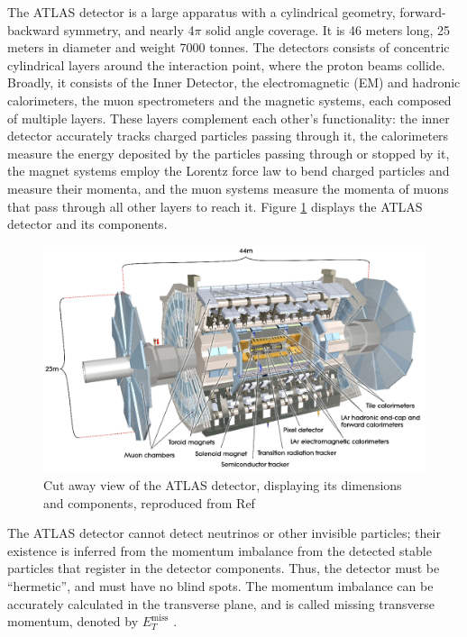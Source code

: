 \documentclass[11pt,a4paper,openright,twoside]{report}
\newcommand{\met}{$E_T^{\mathrm{miss}}$ }
\begin{document}
The ATLAS detector is a large apparatus with a cylindrical geometry, forward-backward symmetry, and nearly 4$\pi$ solid angle coverage. It is 46 meters long, 25 meters in diameter and weight 7000 tonnes. The detectors consists of concentric cylindrical layers around the interaction point, where the proton beams collide. Broadly, it consists of the  Inner Detector, the electromagnetic (EM) and hadronic calorimeters, the muon spectrometers and the magnetic systems, each composed of multiple layers. These layers complement each other's functionality: the inner detector accurately tracks charged particles passing through it, the calorimeters measure the energy deposited by the particles passing through or stopped by it, the magnet systems employ the Lorentz force law to bend charged particles and measure their momenta, and the muon systems measure the momenta of muons that pass through all other layers to reach it. Figure \ref{fig:ATLAS} displays the ATLAS detector and its components.

\begin{figure}[h]
\centering
\includegraphics[width=\textwidth]{ATLAS.png}
\caption{Cut away view of the ATLAS detector, displaying its dimensions and components, reproduced from Ref \cite{ATLAS_detector}}
\label{fig:ATLAS}
\end{figure}

The ATLAS detector cannot detect neutrinos or other invisible particles; their existence is inferred from the momentum imbalance from the detected stable particles that register in the detector components. Thus, the detector must be ``hermetic'', and must have no blind spots. The momentum imbalance can be accurately calculated in the transverse plane, and is called missing transverse momentum, denoted by \met.
\end{document}
